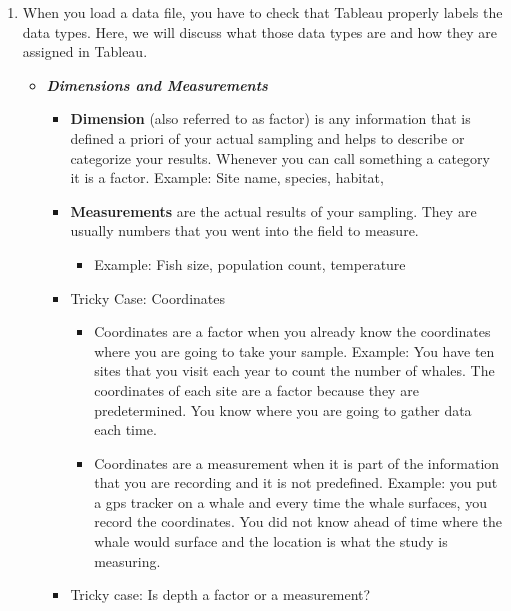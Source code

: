 \documentclass[
]{book}
\providecommand{\tightlist}{%
  \setlength{\itemsep}{0pt}\setlength{\parskip}{0pt}}
\begin{document}
\begin{enumerate}
\def\labelenumi{\arabic{enumi}.}
\tightlist
\item
  When you load a data file, you have to check that Tableau properly labels the data types. Here, we will discuss what those data types are and how they are assigned in Tableau.

  \begin{itemize}
  \tightlist
  \item
    \textbf{\emph{Dimensions and Measurements}}

    \begin{itemize}
    \tightlist
    \item
      \textbf{Dimension} (also referred to as factor) is any information that is defined a priori of your actual sampling and helps to describe or categorize your results. Whenever you can call something a category it is a factor. Example: Site name, species, habitat,
    \item
      \textbf{Measurements} are the actual results of your sampling. They are usually numbers that you went into the field to measure.

      \begin{itemize}
      \tightlist
      \item
        Example: Fish size, population count, temperature
      \end{itemize}
    \item
      Tricky Case: Coordinates

      \begin{itemize}
      \tightlist
      \item
        Coordinates are a factor when you already know the coordinates where you are going to take your sample. Example: You have ten sites that you visit each year to count the number of whales. The coordinates of each site are a factor because they are predetermined. You know where you are going to gather data each time.
      \item
        Coordinates are a measurement when it is part of the information that you are recording and it is not predefined. Example: you put a gps tracker on a whale and every time the whale surfaces, you record the coordinates. You did not know ahead of time where the whale would surface and the location is what the study is measuring.
      \end{itemize}
    \item
      Tricky case: Is depth a factor or a measurement?


\end{itemize}
\end{itemize}
\end{enumerate}
\end{document}
